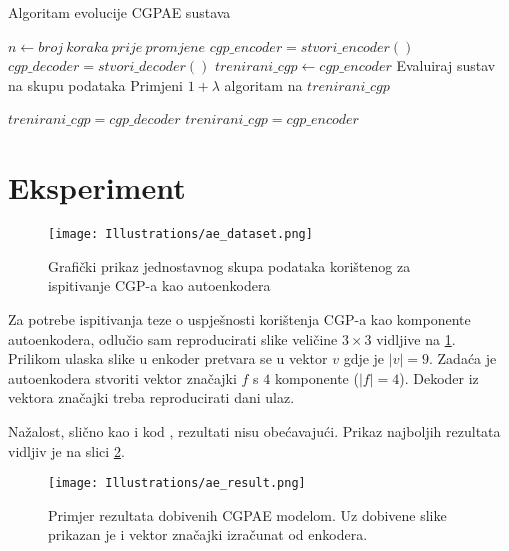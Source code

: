 \begin{algorithm}
	\caption{Algoritam evolucije CGPAE sustava}
	\label{alg:cgpae_evolution}
	\begin{algorithmic}
		\STATE $n \leftarrow broj\ koraka\ prije\ promjene$
		\STATE $cgp\_encoder = stvori\_encoder()$
		\STATE $cgp\_decoder = stvori\_decoder()$
		\STATE $trenirani\_cgp \leftarrow cgp\_encoder$
			\STATE Evaluiraj sustav na skupu podataka
			\STATE Primjeni $1+\lambda$ algoritam na $trenirani\_cgp$

					\STATE $trenirani\_cgp = cgp\_decoder$
				\ELSE
					\STATE $trenirani\_cgp = cgp\_encoder$
				\ENDIF
			\ENDIF
		\ENDWHILE
	\end{algorithmic}
\end{algorithm}

\section{Eksperiment}

\begin{figure}[H]
	\centering
	\texttt{[image: Illustrations/ae\_dataset.png]}
	\caption{Grafički prikaz jednostavnog skupa podataka korištenog za ispitivanje CGP-a kao autoenkodera}
	\label{fig:ae_example}
\end{figure}

Za potrebe ispitivanja teze o uspješnosti korištenja CGP-a kao komponente autoenkodera, odlučio sam reproducirati slike veličine $3 \times 3$ vidljive na \ref{fig:ae_example}.
Prilikom ulaska slike u enkoder pretvara se u vektor $v$ gdje je $|v| = 9$.
Zadaća je autoenkodera stvoriti vektor značajki $f$ s $4$ komponente ($|f| = 4$).
Dekoder iz vektora značajki treba reproducirati dani ulaz.

Nažalost, slično kao i kod \cite{why_ae_diff}, rezultati nisu obećavajući.
Prikaz najboljih rezultata vidljiv je na slici \ref{fig:ae_results}.

\begin{figure}[H]
	\centering
	\texttt{[image: Illustrations/ae\_result.png]}
	\caption{Primjer rezultata dobivenih CGPAE modelom. Uz dobivene slike prikazan je i vektor značajki izračunat od enkodera.}
	\label{fig:ae_results}
\end{figure}

